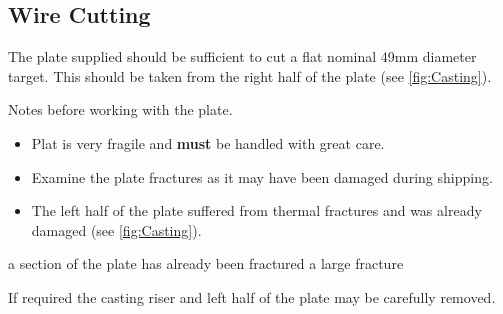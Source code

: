 \subsection{Wire Cutting}
The plate supplied should be sufficient to cut a flat nominal 49mm diameter target. This should be taken from the right half of the plate (see \ref{fig:Casting}). 

Notes before working with the plate.
\begin{itemize}
\item Plat is very fragile and \textbf{must} be handled with great care. 
\item Examine the plate fractures as it may have been damaged during shipping. 
\item The left half of the plate suffered from thermal fractures and was already damaged (see \ref{fig:Casting}).  
\end{itemize}

a section of the plate has already been fractured a large fracture 

If required the casting riser and left half of the plate may be carefully removed.